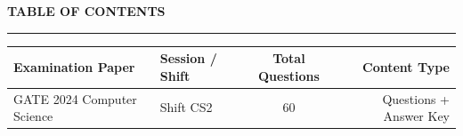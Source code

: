 \documentclass[a4paper,10pt,twoside]{article}
\begin{document}
\newpage

\begin{center}
    {\Large\textbf{TABLE OF CONTENTS}}\\[0.4em]
    \rule{0.5\textwidth}{0.6pt}
\end{center}
\vspace{1em}

\noindent\begin{tabularx}{\linewidth}{|X|l|c|r|}
\hline
\textbf{Examination Paper} & \textbf{Session / Shift} & \textbf{Total Questions} & \textbf{Content Type} \\
\hline

GATE 2024 Computer Science & Shift CS2 & 60 & Questions + Answer Key \\ \hline
\end{tabularx}

\vspace{1.5em}

\newpage
\end{document}
